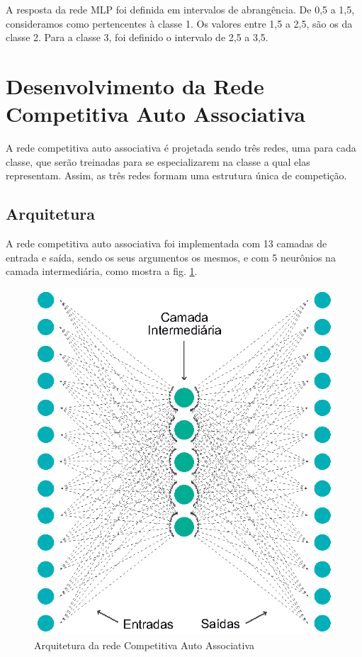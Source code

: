 A resposta da rede MLP foi definida em intervalos de abrangência. De 0,5 a 1,5, consideramos como pertencentes à classe 1. Os valores entre 1,5 a 2,5, são os da classe 2. Para a classe 3, foi definido o intervalo de 2,5 a 3,5.


\section{Desenvolvimento da Rede Competitiva Auto Associativa} \label{desenvolvimentoAuto}

A rede competitiva auto associativa é projetada sendo três redes, uma para cada classe, que serão treinadas para se especializarem na classe a qual elas representam. Assim, as três redes formam uma estrutura única de competição.


\subsection{Arquitetura}

A rede competitiva auto associativa foi implementada com 13 camadas de entrada e saída, sendo os seus argumentos os mesmos, e com 5 neurônios na camada intermediária, como mostra a fig. \ref{figura:arquiteturaAuto}.

\begin{figure}[H]

\centering %
\includegraphics{04-Figuras/Arquitetura-AutoAssociativa}

\caption{Arquitetura da rede Competitiva Auto Associativa}

\label{figura:arquiteturaAuto}

\end{figure}